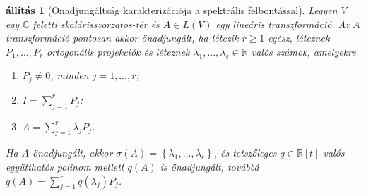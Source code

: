 \documentclass[a4paper, showtrims]{memoir}
\theoremstyle{plain}
\newtheorem{proposition}{állítás}[chapter]
\theoremstyle{remark}
\theoremstyle{definition}
\begin{document}
\begin{proposition}[Önadjungáltság karakterizációja a spektrális felbontással]
	Legyen $V$ egy $\mathbb{C}$ feletti ska\-lá\-ris\-szor\-za\-tos-tér és $A\in L\left( V \right)$ egy lineáris transzformáció.
	Az $A$ transzformáció pontosan akkor önadjungált,
	ha létezik $r\geq 1$ egész, léteznek $P_1,\ldots,P_r$ ortogonális projekciók és
	léteznek $\lambda_1,\ldots,\lambda_r\in\mathbb{R}$ valós számok,
	amelyekre
	\begin{enumerate}
		\item $P_j\neq 0$, minden $j=1,\ldots,r$;
		\item $I=\sum_{j=1}^rP_j$;
		\item $A=\sum_{j=1}^r\lambda_jP_j$.
	\end{enumerate}
	Ha $A$ önadjungált,
	akkor $\sigma\left( A \right)=\left\{ \lambda_1,\ldots,\lambda_r \right\}$,
	és tetszőleges $q\in\mathbb{R}[t]$ valós együtthatós polinom mellett
	$q\left( A \right)$ is önadjungált,
	továbbá
	$q\left( A \right)=\sum_{j=1}^rq\left( \lambda_j \right)P_j$.
\end{proposition}
\end{document}

